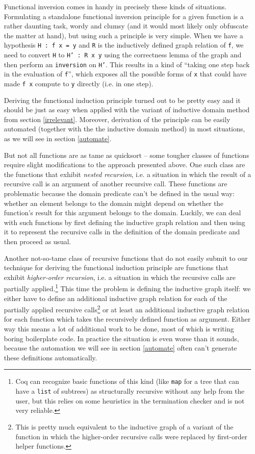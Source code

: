 \documentclass[declaration,mgr,english,shortabstract]{iithesis}
\newcommand{\m}[1]{\texttt{#1}}
\begin{document}
Functional inversion comes in handy in precisely these kinds of situations. Formulating a standalone functional inversion principle for a given function is a rather daunting task, wordy and clumsy (and it would most likely only obfuscate the matter at hand), but using such a principle is very simple. When we have a hypothesis \m{H : f x = y} and \m{R} is the inductively defined graph relation of \m{f}, we need to convert \m{H} to \m{H' : R x y} using the correctness lemma of the graph and then perform an \m{inversion} on \m{H'}. This results in a kind of ``taking one step back in the evaluation of \m{f}'', which exposes all the possible forms of \m{x} that could have made \m{f x} compute to \m{y} directly (i.e. in one step).

Deriving the functional induction principle turned out to be pretty easy and it should be just as easy when applied with the variant of inductive domain method from section \ref{irrelevant}. Moreover, derivation of the principle can be easily automated (together with the the inductive domain method) in most situations, as we will see in section \ref{automate}.

But not all functions are as tame as quicksort -- some tougher classes of functions require slight modifications to the approach presented above. One such class are the functions that exhibit \textit{nested recursion}, i.e. a situation in which the result of a recursive call is an argument of another recursive call. These functions are problematic because the domain predicate can't be defined in the usual way: whether an element belongs to the domain might depend on whether the function's result for this argument belongs to the domain. Luckily, we can deal with such functions by first defining the inductive graph relation and then using it to represent the recursive calls in the definition of the domain predicate and then proceed as usual.

Another not-so-tame class of recursive functions that do not easily submit to our technique for deriving the functional induction principle are functions that exhibit \textit{higher-order recursion}, i.e. a situation in which the recursive calls are partially applied.\footnote{Coq can recognize basic functions of this kind (like \m{map} for a tree that can have a \m{list} of subtrees) as structurally recursive without any help from the user, but this relies on some heuristics in the termination checker and is not very reliable.} This time the problem is defining the inductive graph itself: we either have to define an additional inductive graph relation for each of the partially applied recursive calls\footnote{This is pretty much equivalent to the inductive graph of a variant of the function in which the higher-order recursive calls were replaced by first-order helper functions.} or at least an additional inductive graph relation for each function which takes the recursively defined function as argument. Either way this means a lot of additional work to be done, most of which is writing boring boilerplate code. In practice the situation is even worse than it sounds, because the automation we will see in section \ref{automate} often can't generate these definitions automatically.
\end{document}
